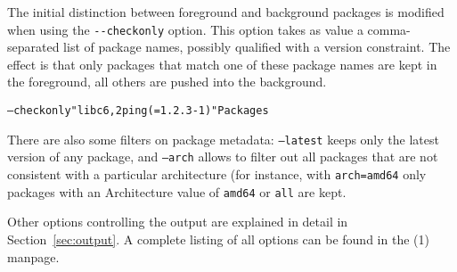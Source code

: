 The initial distinction between foreground and background packages is
modified when using the \verb|--checkonly| option. This option takes
as value a comma-separated list of package names, possibly qualified
with a version constraint. The effect is that only packages that match
one of these package names are kept in the foreground, all others are
pushed into the background.

\begin{example}
\begin{alltt}
\debcheck{} --checkonly "libc6, 2ping (= 1.2.3-1)" Packages
\end{alltt}
\end{example}

There are also some filters on package metadata: \texttt{--latest}
keeps only the latest version of any package, and \texttt{--arch}
allows to filter out all packages that are not consistent with a
particular architecture (for instance, with \texttt{arch=amd64} only
packages with an Architecture value of \texttt{amd64} or \texttt{all}
are kept.

Other options controlling the output are explained in detail in
Section~\ref{sec:output}. A complete listing of all options can be found in
the \debcheck(1) manpage.


